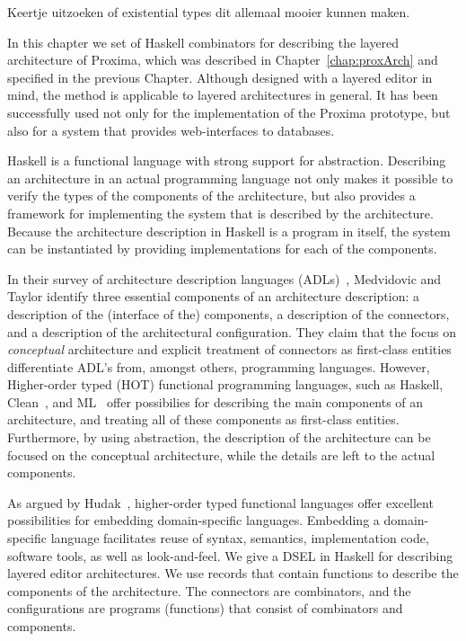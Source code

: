 \documentclass[preprint,natbib]{sigplanconf}
\begin{document}
Keertje uitzoeken of existential types dit allemaal mooier kunnen maken.
\ec



In this chapter we set of Haskell combinators for describing the layered architecture of Proxima, which was described in Chapter~\ref{chap:proxArch} and specified in the previous Chapter. Although designed with a layered editor in mind, the method is applicable to layered architectures in general. It has been successfully used not only for the implementation of the Proxima prototype, but also for a system that provides web-interfaces to databases. 

Haskell is a functional language with strong support for abstraction. Describing an architecture in an actual programming language not only makes it possible to verify the types of the components of the architecture, but also provides a framework for implementing the system that is described by the architecture. Because the architecture description in Haskell is a program in itself, the system can be instantiated by providing implementations for each of the components.

In their survey of architecture description languages (ADLs)~\cite{medvidovic00ADLs}, Medvidovic and Taylor identify three essential components of an architecture description: a description of the (interface of the) components, a description of the connectors, and a description of the architectural configuration. They claim that the focus on {\em conceptual} architecture and explicit treatment of connectors as first-class entities differentiate ADL's from, amongst others, programming languages. However, Higher-order typed (HOT) functional programming languages, such as Haskell, Clean~\cite{plasmeijer01clean}, and ML~\cite{milner97ML} offer possibilies for describing the main components of an architecture, and treating all of these components as first-class entities. Furthermore, by using abstraction, the description of the architecture can be focused on the conceptual architecture, while the details are left to the actual components.

As argued by Hudak~\cite{hudak98DSLs}, higher-order typed functional languages offer excellent possibilities for embedding domain-specific languages. Embedding a domain-specific language facilitates reuse of syntax, semantics, implementation code, software tools, as well as look-and-feel. We give a DSEL in Haskell for describing layered editor architectures. We use records that contain functions to describe the components of the architecture. The connectors are combinators, and the configurations are programs (functions) that consist of combinators and components. 
\end{document}
